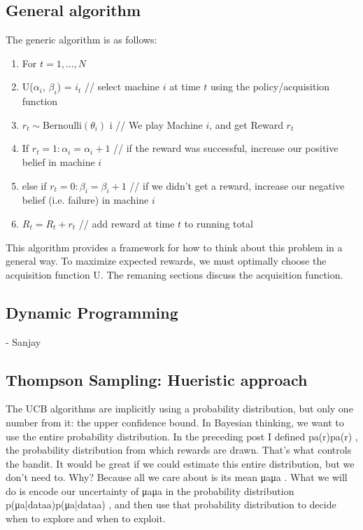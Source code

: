 \documentclass{article}
\begin{document}
\subsection{General algorithm}

The generic algorithm is as follows:

\begin{enumerate}
\item For $t = 1, ..., N$
\item U($\alpha_i$, $\beta_i$) = $i_t$  // select machine $i$ at time $t$ using the policy/acquisition function
\item $r_t \sim \text{Bernoulli}(\theta_{i})$  i  // We play Machine $i$, and get Reward $r_t$
\item If $r_t = 1: \alpha_i = \alpha_i + 1$   // if the reward was successful, increase our positive belief in machine $i$
\item else if $r_t = 0: \beta_i = \beta_i + 1$  // if we didn't get a reward, increase our negative belief (i.e. failure) in machine $i$
\item $R_t = R_t + r_t$		// add reward at time $t$ to running total
\end{enumerate}

This algorithm provides a framework for how to think about this problem in a general way. To maximize expected rewards, we must optimally choose the acquisition function U. The remaning sections discuss the acquisition function.

\subsection{Dynamic Programming}

- Sanjay

\subsection{Thompson Sampling: Hueristic approach}

 The UCB algorithms are implicitly using a probability distribution, but only one number from it: the upper confidence bound.  In Bayesian thinking, we want to use the entire probability distribution.  In the preceding post I defined pa(r)pa(r) , the probability distribution from which rewards are drawn.  That's what controls the bandit.  It would be great if we could estimate this entire distribution, but we don't need to.  Why?  Because all we care about is its mean μaμa .  What we will do is encode our uncertainty of μaμa in the probability distribution p(μa|dataa)p(μa|dataa) , and then use that probability distribution to decide when to explore and when to exploit.
\end{document}
